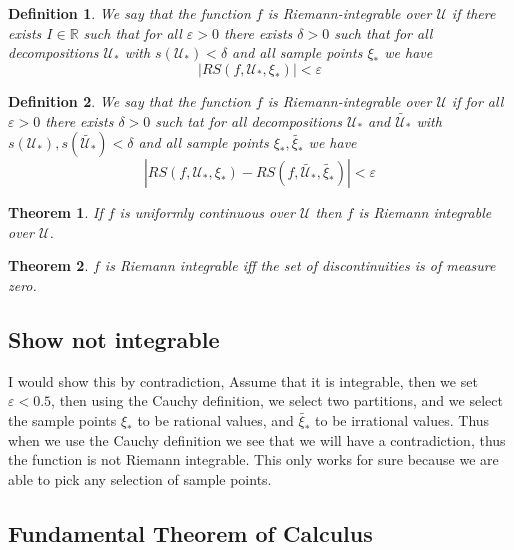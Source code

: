 \documentclass[12pt]{armath}
\newtheorem{theorem}{Theorem}[section]
\newtheorem{definition}{Definition}[section]
\newcommand{\U}{\mathcal{U}}
\newcommand{\R}{\mathbb{R}}
\newcommand{\abs}[1]{\left\vert{#1}\right\vert}
\newcommand{\e}{\varepsilon}
\newcommand{\de}{\delta}
\begin{document}
\begin{definition}
  We say that the function $f$ is Riemann-integrable over $\U$ if there exists
  $I\in\R$ such that for all $\e>0$ there exists $\de>0$ such that for all
  decompositions $\U_*$ with $s(\U_*)<\de$ and all sample points $\xi_*$ we
  have
  \[
    \abs{RS(f,\U_*,\xi_*)}<\e
  \]
\end{definition}

\begin{definition}
  We say that the function $f$ is Riemann-integrable over $\U$ if for all
  $\e>0$ there exists $\de>0$ such tat for all decompositions $\U_*$ and
  $\widetilde{\U_*}$ with $s(\U_*),s(\widetilde{\U_*})<\de$ and all sample
  points $\xi_*,\widetilde{\xi_*}$ we have
  \[
    \abs{RS(f,\U_*,\xi_*)-RS(f,\widetilde{\U_*},\widetilde{\xi_*})} < \e
  \]
\end{definition}

\begin{theorem}
  If $f$ is uniformly continuous over $\U$ then $f$ is Riemann integrable over
  $\U$.
\end{theorem}

\begin{theorem}
  $f$ is Riemann integrable iff the set of discontinuities is of measure zero.
\end{theorem}

\subsection{Show not integrable}%
\label{sub:show_not_integrable}

I would show this by contradiction, Assume that it is integrable, then we set
$\e<0.5$, then using the Cauchy definition, we select two partitions, and we
select the sample points $\xi_*$ to be rational values, and $\widetilde{\xi_*}$
to be irrational values. Thus when we use the Cauchy definition we see that we
will have a contradiction, thus the function is not Riemann integrable. This
only works for sure because we are able to pick any selection of sample points.

\subsection{Fundamental Theorem of Calculus}%
\label{sub:fundamental_theorem_of_calculus}
\end{document}
